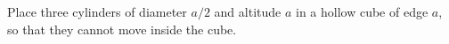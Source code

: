 Place three cylinders of diameter $a/2$ and altitude $a$ in a hollow cube of edge $a$, so that they cannot move inside the cube.
